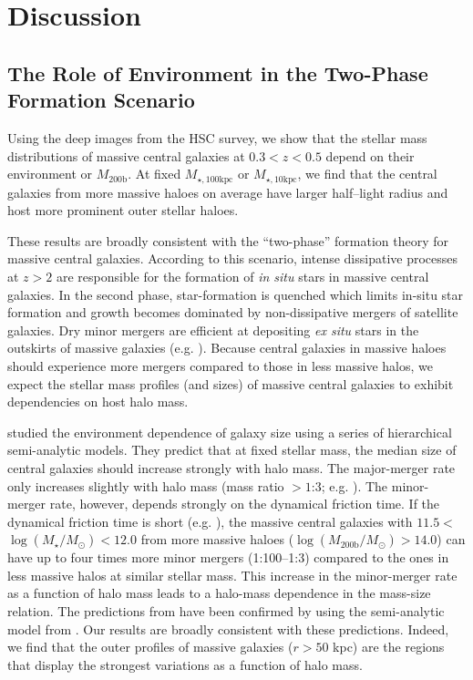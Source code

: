 \documentclass[a4paper,fleqn,usenatbib]{mnras}
\def\mhalo{{$M_{\mathrm{200b}}$}}
\def\logms{{$\log (M_{\star}/M_{\odot})$}}
\def\logmh{{$\log (M_{\mathrm{200b}}/M_{\odot})$}}
\def\minn{{$M_{\star,10\mathrm{kpc}}$}}
\def\mtot{{$M_{\star,100\mathrm{kpc}}$}}
\begin{document}
\section{Discussion}
    \label{sec:discussion}

\subsection{The Role of Environment in the Two-Phase Formation Scenario}
            
    Using the deep images from the HSC survey, we show that the stellar mass 
    distributions of massive central galaxies at $0.3 < z < 0.5$ depend on their 
    environment or \mhalo{}. 
    At fixed \mtot{} or \minn{}, we find that the central galaxies from more massive 
    haloes on average have larger half--light radius and host more prominent outer 
    stellar haloes. 
    
    These results are broadly consistent with the ``two-phase'' formation theory for 
    massive central galaxies.
    According to this scenario, intense dissipative processes at $z > 2$ are 
    responsible for the formation of \textit{in situ} stars in massive central 
    galaxies. 
    In the second phase, star-formation is quenched which limits in-situ star 
    formation and growth becomes dominated by non-dissipative mergers of satellite
    galaxies. 
    Dry minor mergers are efficient at depositing \textit{ex situ} stars in the 
    outskirts of massive galaxies (e.g. \citealt{Oogi2013, Bedorf2013}). 
    Because central galaxies in massive haloes should experience more mergers 
    compared to those in less massive halos, we expect the stellar mass profiles 
    (and sizes) of massive central galaxies to exhibit dependencies on host halo 
    mass.
   
    \citet{Shankar2014} studied the environment dependence of galaxy size using 
    a series of hierarchical semi-analytic models. 
    They predict that at fixed stellar mass, the median size of central galaxies 
    should increase strongly with halo mass. 
    The major-merger rate only increases slightly with halo mass (mass ratio $>1$:3; 
    e.g. \citealt{Hirschmann2013}). 
    The minor-merger rate, however, depends strongly on the dynamical friction time. 
    If the dynamical friction time is short (e.g. \citealt{Newman2012}), the
    massive central galaxies with $11.5 <$\logms{}$<12.0$ from more massive haloes 
    (\logmh{}$>14.0$) can have up to four times more minor mergers (1:100--1:3)
    compared to the ones in less massive halos at similar stellar mass. 
    This increase in the minor-merger rate as a function of halo mass leads to a 
    halo-mass dependence in the mass-size relation. 
    The predictions from \citet{Shankar2014} have been confirmed by \citet{Yoon2017} 
    using the semi-analytic model from \citet{Guo2011}.  
    Our results are broadly consistent with these predictions. 
    Indeed, we find that the outer profiles of massive galaxies ($r>50$ kpc) are the 
    regions that display the strongest variations as a function of halo mass. 
   
\end{document}
